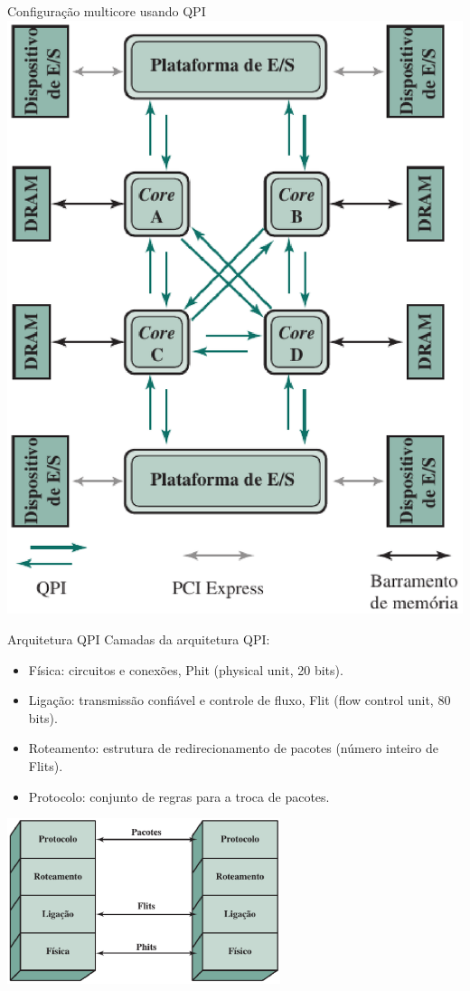 \begin{slide}{Configuração multicore usando QPI}
	\centering
	\includegraphics[height=0.8\textheight]{figs/3-17}
\end{slide}

\begin{slide}{Arquitetura QPI}
	Camadas da arquitetura QPI:
	\begin{itemize}
		\item Física: circuitos e conexões, Phit (physical unit, 20 bits).
		\item Ligação: transmissão confiável e controle de fluxo, Flit (flow control unit, 80 bits).
		\item Roteamento: estrutura de redirecionamento de pacotes (número inteiro de Flits).
		\item Protocolo: conjunto de regras para a troca de pacotes.
	\end{itemize}
   \centering
   \includegraphics[width=0.6\textwidth]{figs/3-18}
\end{slide}

